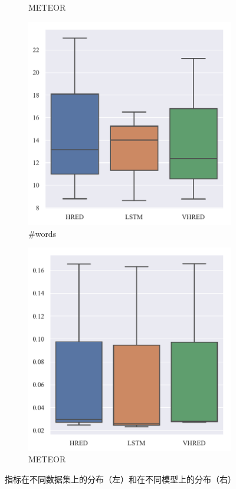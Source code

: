 \begin{figure}[H]
\begin{subfigure}{0.23\linewidth}
        \caption{METEOR}
    \end{subfigure}%
    \begin{subfigure}{0.23\linewidth}
        \centering
        \includegraphics[width=\linewidth]{figure/boxplot/model/utterance_len/plot.pdf}
        \caption{\#words}
    \end{subfigure}%
    \begin{subfigure}{0.23\linewidth}
        \centering
        \includegraphics[width=\linewidth]{figure/boxplot/model/meteor/plot.pdf}
        \caption{METEOR}
    \end{subfigure}
    \centering
    \caption{指标在不同数据集上的分布（左）和在不同模型上的分布（右）}
\end{figure}
